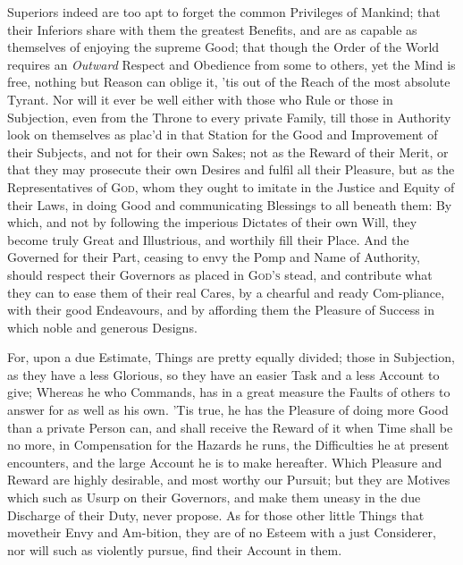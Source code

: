 Superiors indeed are too apt to forget the common Privileges of
Mankind; that their Inferiors share with them the greatest Benefits,
and are as capable as themselves of enjoying the supreme Good; that
though the Order of the World requires an \textit{Outward} Respect and
Obedience from some to others, yet the Mind  is free, nothing
but Reason can oblige it, 'tis out of the Reach of the most absolute
Tyrant. Nor will it ever be well either with those who Rule or those
in Subjection, even from the Throne to every private Family, till
those in Authority look on themselves as plac'd in that Station for
the Good and Improvement of their Subjects, and not for their own
Sakes; not as the Reward of their Merit, or that they may prosecute
their own Desires and fulfil all their Pleasure, but as the
Representatives of \textsc{God}, whom they ought to imitate in the
Justice and Equity of their Laws, in doing Good and communicating
Blessings to all beneath them: By which, and not by following the
imperious Dictates of their own Will, they become truly Great and
Illustrious, and worthily fill their Place. And the Governed for their
Part, ceasing to envy the Pomp and Name of Authority, should respect
their Governors as placed in \textsc{God's} stead, and contribute what
they can to ease them of their real Cares, by a chearful and ready
Com-pliance, with their good Endeavours, and by affording
them the Pleasure of Success in which noble and generous Designs.

For, upon a due Estimate, Things are pretty equally divided; those in
Subjection, as they have a less Glorious, so they have an easier Task
and a less Account to give; Whereas he who Commands, has in a great
measure the Faults of others to answer for as well as his own. 'Tis
true, he has the Pleasure of doing more Good than a private Person
can, and shall receive the Reward of it when Time shall be no more, in
Compensation for the Hazards he runs, the Difficulties he at present
encounters, and the large Account he is to make hereafter. Which
Pleasure and Reward are highly desirable, and most worthy our Pursuit;
but they are Motives which such as Usurp on their Governors, and make
them uneasy in the due Discharge of their Duty, never propose. As for
those other little Things that movetheir Envy and Am-bition,
they are of no Esteem with a just Considerer, nor will such as
violently pursue, find their Account in them.

